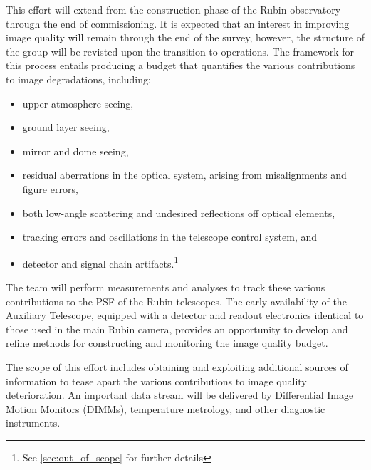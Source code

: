 \documentclass[SE,authoryear,toc]{lsstdoc}
\begin{document}
This effort will extend from the construction phase of the Rubin observatory through the end of commissioning.
It is expected that an interest in improving image quality will remain through the end of the survey, however, the structure of the group will be revisted upon the transition to operations.
The framework for this process entails producing a budget that quantifies the various contributions to image degradations, including:
\begin{itemize}
\item upper atmosphere seeing,
\item ground layer seeing,
\item mirror and dome seeing,
\item residual aberrations in the optical system, arising from misalignments and figure errors,
\item both low-angle scattering and undesired reflections off optical elements,
\item tracking errors and oscillations in the telescope control system, and
\item detector and signal chain artifacts.\footnote{See \ref{sec:out_of_scope} for further details}
\end{itemize}

The team will perform measurements and analyses to track these various contributions to the PSF of the Rubin telescopes.
The early availability of the Auxiliary Telescope, equipped with a detector and readout electronics identical to those used in the main Rubin camera, provides an opportunity to develop and refine methods for constructing and monitoring the image quality budget.

The scope of this effort includes obtaining and exploiting additional sources of information to tease apart the various contributions to image quality deterioration.
An important data stream will be delivered by Differential Image Motion Monitors (DIMMs), temperature metrology, and other diagnostic instruments.
\end{document}
